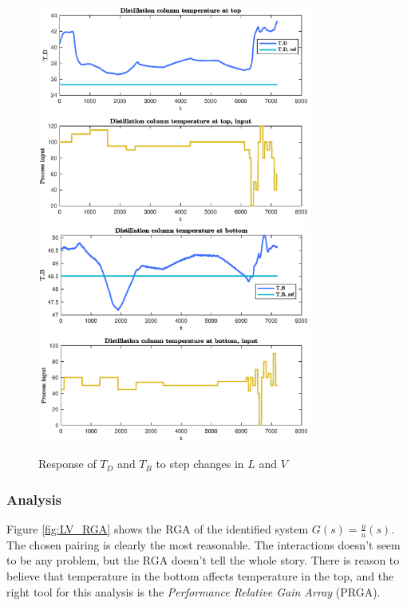 \documentclass[12pt]{article}
\begin{document}
\begin{figure}[p]
\centering
\includegraphics[width=0.8\textwidth]{../Systemanalyse/Log_Data_to_Matlab/Figurer/LV_identifisering/T_D_eksperiment.eps}
\includegraphics[width=0.8\textwidth]{../Systemanalyse/Log_Data_to_Matlab/Figurer/LV_identifisering/T_B_eksperiment.eps}
\caption{Response of $T_D$ and $T_B $ to step changes in $L$ and $V$}
\label{fig:LV_experiment}
\end{figure}

\subsubsection{Analysis}
Figure \ref{fig:LV_RGA} shows the RGA of the identified system $G(s) = \frac{y}{u}(s)$. The chosen pairing is clearly the most reasonable. The interactions doesn't seem to be any problem, but the RGA doesn't tell the whole story. There is reason to believe that temperature in the bottom affects temperature in the top, and the right tool for this analysis is the \textit{Performance Relative Gain Array} (PRGA).
\end{document}
